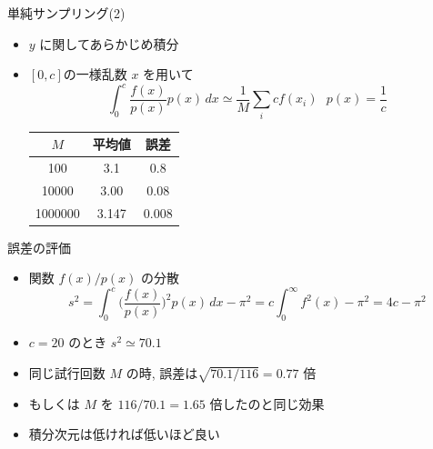 \documentclass[dvipdfmx]{beamer}
\begin{document}
\begin{frame}[t,fragile]{単純サンプリング(2)}
  \begin{itemize}
    \setlength{\itemsep}{1em}
  \item $y$ に関してあらかじめ積分
  \item $[0,c]$の一様乱数 $x$ を用いて
    \[
    \int_0^c \frac{f(x)}{p(x)} p(x) \, dx \simeq \frac{1}{M} \sum_i c f(x_i) \ \ \ p(x) = \frac{1}{c}
    \]
    \begin{tabular}{|c|c|c|}
      \hline
      $M$ & 平均値 & 誤差 \\
      \hline
      100 & 3.1 & 0.8 \\
      10000 & 3.00 & 0.08 \\
      1000000 & 3.147 & 0.008 \\
      \hline
    \end{tabular}
  \end{itemize}
  \vspace*{-7em}
  \hspace*{17em}
\end{frame}

\begin{frame}[t,fragile]{誤差の評価}
  \begin{itemize}
    \setlength{\itemsep}{1em}
  \item 関数 $f(x)/p(x)$ の分散
    \[
    s^2 = \int_0^c \Big(\frac{f(x)}{p(x)}\Big)^2 p(x) \, dx - \pi^2 = c \int_0^\infty f^2(x) - \pi^2 = 4c - \pi^2
    \]
  \item $c=20$ のとき $s^2 \simeq 70.1$
  \item 同じ試行回数 $M$ の時, 誤差は$\sqrt{70.1/116} = 0.77$ 倍
  \item もしくは $M$ を $116/70.1 = 1.65$ 倍したのと同じ効果
  \item 積分次元は低ければ低いほど良い
  \end{itemize}
\end{frame}
\end{document}
